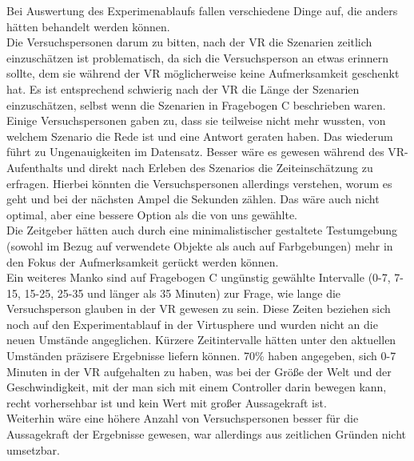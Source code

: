 \documentclass{Bericht}
\begin{document}
Bei Auswertung des Experimenablaufs fallen verschiedene Dinge auf, die anders hätten behandelt werden können.\\
Die Versuchspersonen darum zu bitten, nach der VR die Szenarien zeitlich einzuschätzen ist problematisch, da sich die Versuchsperson an etwas erinnern sollte, dem sie während der VR möglicherweise keine Aufmerksamkeit geschenkt hat.
 Es ist entsprechend schwierig nach der VR die Länge der Szenarien einzuschätzen, selbst wenn die Szenarien in Fragebogen C beschrieben waren. Einige Versuchspersonen gaben zu, dass sie teilweise nicht mehr wussten, von welchem Szenario die Rede ist und eine Antwort geraten haben. Das wiederum führt zu Ungenauigkeiten im Datensatz. 
 Besser wäre es gewesen während des VR-Aufenthalts und direkt nach Erleben des Szenarios die Zeiteinschätzung zu erfragen. Hierbei könnten die Versuchspersonen allerdings verstehen, worum es geht und bei der nächsten Ampel die Sekunden zählen. Das wäre auch nicht optimal, aber eine bessere Option als die von uns gewählte.\\
Die Zeitgeber hätten auch durch eine minimalistischer gestaltete Testumgebung (sowohl im Bezug auf verwendete Objekte als auch auf Farbgebungen) mehr in den Fokus der Aufmerksamkeit gerückt werden können.\\
Ein weiteres Manko sind auf Fragebogen C ungünstig gewählte Intervalle (0-7, 7-15, 15-25, 25-35 und länger als 35 Minuten) zur Frage, wie lange die Versuchsperson glauben in der VR gewesen zu sein. Diese Zeiten beziehen sich noch auf den Experimentablauf in der Virtusphere und wurden nicht an die neuen Umstände angeglichen. 
Kürzere Zeitintervalle hätten unter den aktuellen Umständen präzisere Ergebnisse liefern können. 70\% haben angegeben, sich 0-7 Minuten in der VR aufgehalten zu haben, was bei der Größe der Welt und der Geschwindigkeit, mit der man sich mit einem Controller darin bewegen kann, recht vorhersehbar ist und kein Wert mit großer Aussagekraft ist.\\
Weiterhin wäre eine höhere Anzahl von Versuchspersonen besser für die Aussagekraft der Ergebnisse gewesen, war allerdings aus zeitlichen Gründen nicht umsetzbar.
\end{document}
